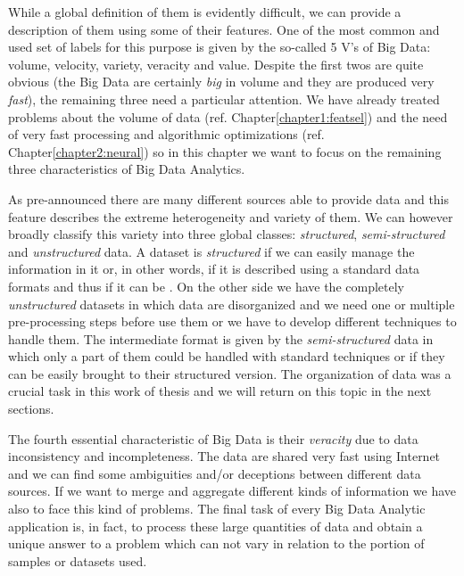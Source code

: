 \documentclass{standalone}
\begin{document}
While a global definition of them is evidently difficult, we can provide a description of them using some of their  features.
One of the most common and used set of labels for this purpose is given by the so-called 5 V's of Big Data: volume, velocity, variety, veracity and value.
Despite the first twos are quite obvious (the Big Data are certainly \emph{big} in volume and they are produced very \emph{fast}), the remaining three need a particular attention.
We have already treated problems about the volume of data (ref. Chapter\ref{chapter1:featsel}) and the need of very fast processing and algorithmic optimizations (ref. Chapter\ref{chapter2:neural}) so in this chapter we want to focus on the remaining three characteristics of Big Data Analytics.

As pre-announced there are many different sources able to provide data and this feature describes the extreme heterogeneity and variety of them.
We can however broadly classify this variety into three global classes: \emph{structured}, \emph{semi-structured} and \emph{unstructured} data.
A dataset is \emph{structured} if we can easily manage the information in it or, in other words, if it is described using a standard data formats and thus if it can be .
On the other side we have the completely \emph{unstructured} datasets in which data are disorganized and we need one or multiple pre-processing steps before use them or we have to develop different techniques to handle them.
The intermediate format is given by the \emph{semi-structured} data in which only a part of them could be handled with standard techniques or if they can be easily brought to their structured version.
The organization of data was a crucial task in this work of thesis and we will return on this topic in the next sections.

The fourth essential characteristic of Big Data is their \emph{veracity} due to data inconsistency and incompleteness.
The data are shared very fast using Internet and we can find some ambiguities and/or deceptions between different data sources.
If we want to merge and aggregate different kinds of information we have also to face this kind of problems.
The final task of every Big Data Analytic application is, in fact, to process these large quantities of data and obtain a unique answer to a problem which can not vary in relation to the portion of samples or datasets used.
\end{document}
